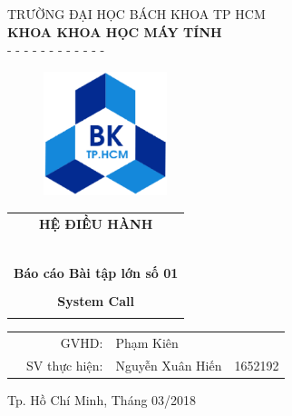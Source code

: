 \documentclass[a4paper,12pt]{article}
\begin{document}
\begin{titlepage}
\vspace{0cm}
\begin{center}
TRƯỜNG ĐẠI HỌC BÁCH KHOA TP HCM \\
\textbf{KHOA KHOA HỌC MÁY TÍNH } \\
- - - - - - - - - - - -
\end{center}


\vspace{1cm}
\begin{figure}[h!]
\begin{center}
\includegraphics[width=3.6cm]{Images/hcmut.eps}
\end{center}
\end{figure}
\vspace{1cm}



\begin{center}
\begin{tabular}{c}
\multicolumn{1}{c}{\textbf{{\huge HỆ ĐIỀU HÀNH }}}\\
~~\\
\hline
\\

\multicolumn{1}{c}{\textbf{{\Large Báo cáo Bài tập lớn số 01}}}\\
\\

\textbf{{\Huge System Call}} \\
\\
\hline
\end{tabular}
\end{center}

\vspace{1.8cm}
\begin{table}[h]
\begin{tabular}{rrll}
\hspace{5cm} & GVHD: & Phạm Kiên&  \\
 & SV thực hiện: & Nguyễn Xuân Hiến &1652192
\end{tabular}
\end{table}
\vspace{5cm}

\begin{center}
{\footnotesize Tp. Hồ Chí Minh, Tháng 03/2018}
\end{center}
\end{titlepage}
\end{document}

